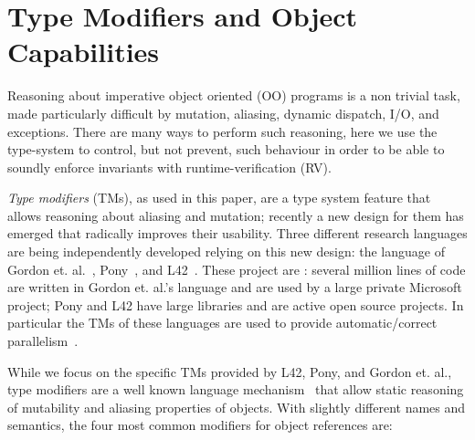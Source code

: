 \section{Type Modifiers and Object Capabilities}
\label{s:background}
Reasoning about imperative object oriented (OO) programs is a non trivial task,
made particularly difficult by mutation, aliasing, dynamic dispatch, I/O, and exceptions. There are many ways to perform such reasoning, here we use the type-system to control, but not prevent, such behaviour in order to be able to soundly enforce invariants with runtime-verification (RV).

\emph{Type modifiers} (TMs), as used in this paper, are a type system feature that allows reasoning about aliasing and mutation; recently a new design for them has emerged that radically improves their usability.
Three different research languages are being independently developed relying on this new design: the language of Gordon et. al.~\cite{GordonEtAl12}, Pony~\cite{clebsch2015deny,clebsch2017orca}, and L42~\cite{ServettoZucca15,ServettoEtAl13a,JOT:issue_2011_01/article1,GianniniEtAl16}.
These project are : several million lines of code are written in Gordon et. al.'s language and are used by a large private Microsoft project; Pony and L42 have large libraries and are active open source projects. In particular the TMs of these languages are used to provide automatic/correct parallelism~\cite{GordonEtAl12,clebsch2015deny,clebsch2017orca,ServettoEtAl13a}.

While we focus on the specific TMs provided by L42, Pony, and Gordon et. al., type modifiers
 are a well known language mechanism~\cite{TschantzErnst05,BirkaErnst04,OstlundEtAl08,clebsch2015deny,GianniniEtAl16,GordonEtAl12}
 that allow static reasoning of mutability and aliasing properties of objects.
With slightly different names and semantics, the four most common modifiers for object references are:

